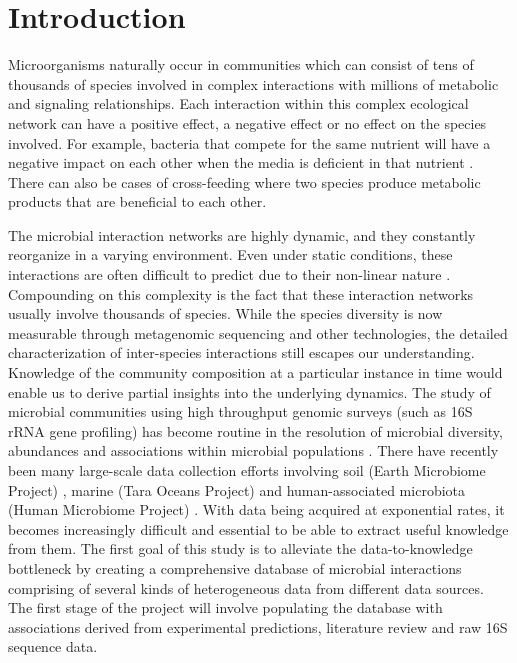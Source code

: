 
\section*{Introduction}

  Microorganisms naturally occur in communities which can consist of tens of thousands of species involved in complex interactions with millions of metabolic and signaling relationships.
  Each interaction within this complex ecological network can have a positive effect, a negative effect or no effect on the species involved.
  For example, bacteria that compete for the same nutrient will have a negative impact on each other when the media is deficient in that nutrient \cite{Ghoul2016}.
  There can also be cases of cross-feeding where two species produce metabolic products that are beneficial to each other.

  The microbial interaction networks are highly dynamic, and they constantly reorganize in a varying environment.
  Even under static conditions, these interactions are often difficult to predict due to their non-linear nature \cite{Konopka2015}.
  Compounding on this complexity is the fact that these interaction networks usually involve thousands of species.
  While the species diversity is now measurable through metagenomic sequencing and other technologies, the detailed characterization of inter-species interactions still escapes our understanding.
  Knowledge of the community composition at a particular instance in time would enable us to derive partial insights into the underlying dynamics.
  The study of microbial communities using high throughput genomic surveys (such as 16S rRNA gene profiling) has become routine in the resolution of microbial diversity, abundances and associations within microbial populations \cite{Jovel2016}.
  There have recently been many large-scale data collection efforts involving soil (Earth Microbiome Project) \cite{Thompson2017}, marine (Tara Oceans Project) \cite{Zhang2015} and human-associated microbiota (Human Microbiome Project) \cite{HumanMicrobiomeProjectConsortium2012}.
  With data being acquired at exponential rates, it becomes increasingly difficult and essential to be able to extract useful knowledge from them.
  The first goal of this study is to alleviate the data-to-knowledge bottleneck by creating a comprehensive database of microbial interactions comprising of several kinds of heterogeneous data from different data sources.
  The first stage of the project will involve populating the database with associations derived from experimental predictions, literature review and raw 16S sequence data.

